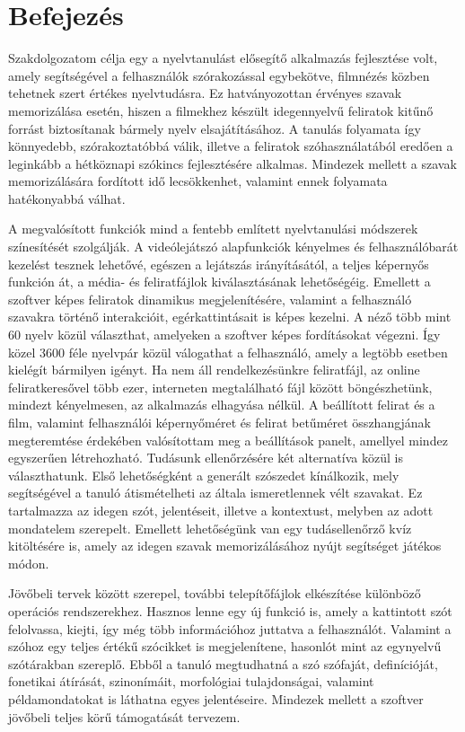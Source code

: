 \chapter*{Befejezés}

Szakdolgozatom célja egy a nyelvtanulást elősegítő alkalmazás fejlesztése volt, amely segítségével a felhasználók szórakozással egybekötve, filmnézés közben tehetnek szert értékes nyelvtudásra. Ez hatványozottan érvényes szavak memorizálása esetén, hiszen a filmekhez készült idegennyelvű feliratok kitűnő forrást biztosítanak bármely nyelv elsajátításához. A tanulás folyamata így könnyedebb, szórakoztatóbbá válik, illetve a feliratok szóhasználatából eredően a leginkább a hétköznapi szókincs fejlesztésére alkalmas. Mindezek mellett a szavak memorizálására fordított idő lecsökkenhet, valamint ennek folyamata hatékonyabbá válhat. 

A megvalósított funkciók mind a fentebb említett nyelvtanulási módszerek színesítését szolgálják. A videólejátszó alapfunkciók kényelmes és felhasználóbarát kezelést tesznek lehetővé, egészen a lejátszás irányításától, a teljes képernyős funkción át, a média- és feliratfájlok kiválasztásának lehetőségéig. Emellett a szoftver képes feliratok dinamikus megjelenítésére, valamint a felhasználó szavakra történő interakcióit, egérkattintásait is képes kezelni. A néző több mint 60 nyelv közül választhat, amelyeken a szoftver képes fordításokat végezni. Így közel 3600 féle nyelvpár közül válogathat a felhasználó, amely a legtöbb esetben kielégít bármilyen igényt. Ha nem áll rendelkezésünkre feliratfájl, az online feliratkeresővel több ezer, interneten megtalálható fájl között böngészhetünk, mindezt kényelmesen, az alkalmazás elhagyása nélkül. A beállított felirat és a film, valamint felhasználói képernyőméret és felirat betűméret összhangjának megteremtése érdekében valósítottam meg a beállítások panelt, amellyel mindez egyszerűen létrehozható. Tudásunk ellenőrzésére két alternatíva közül is választhatunk. Első lehetőségként a generált szószedet kínálkozik, mely segítségével a tanuló átismételheti az általa ismeretlennek vélt szavakat. Ez tartalmazza az idegen szót, jelentéseit, illetve a kontextust, melyben az adott mondatelem szerepelt. Emellett lehetőségünk van egy tudásellenőrző kvíz kitöltésére is, amely az idegen szavak memorizálásához nyújt segítséget játékos módon.

Jövőbeli tervek között szerepel, további telepítőfájlok elkészítése különböző operációs rendszerekhez. Hasznos lenne egy új funkció is, amely a kattintott szót felolvassa, kiejti, így még több információhoz juttatva a felhasználót. Valamint a szóhoz egy teljes értékű szócikket is megjelenítene, hasonlót mint az egynyelvű szótárakban szereplő. Ebből a tanuló megtudhatná a szó szófaját, definícióját, fonetikai átírását, szinonímáit, morfológiai tulajdonságai, valamint példamondatokat is láthatna egyes jelentéseire. Mindezek mellett a szoftver jövőbeli teljes körű támogatását tervezem.